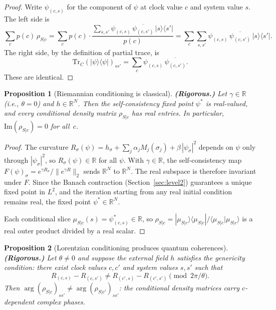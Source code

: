 \documentclass[12pt,a4paper]{article}
\newtheorem{proposition}{Proposition}
\theoremstyle{definition}
\theoremstyle{remark}
\begin{document}
\begin{proof}
Write $\psi_{(c,s)}$ for the component of $\psi$ at clock value $c$
and system value $s$. The left side is
\[
\sum_c p(c)\,\rho_{S|c} = \sum_c p(c) \cdot
\frac{\sum_{s,s'} \psi_{(c,s)}\,\overline{\psi_{(c,s')}}\,
|s\rangle\langle s'|}{p(c)}
= \sum_c \sum_{s,s'} \psi_{(c,s)}\,\overline{\psi_{(c,s')}}\,
|s\rangle\langle s'|.
\]
The right side, by the definition of partial trace, is
\[
\mathrm{Tr}_C(|\psi\rangle\langle\psi|)_{ss'}
= \sum_c \psi_{(c,s)}\,\overline{\psi_{(c,s')}}.
\]
These are identical.
\end{proof}

\begin{proposition}[Riemannian conditioning is classical]
\textbf{(Rigorous.)}
\label{prop:riem_classical}
Let $\gamma \in \mathbb{R}$ (i.e., $\theta = 0$) and $h \in
\mathbb{R}^N$. Then the self-consistency fixed point $\psi^*$ is
real-valued, and every conditional density matrix $\rho_{S|c}$ has
real entries. In particular, $\mathrm{Im}(\rho_{S|c}) = 0$ for all~$c$.
\end{proposition}

\begin{proof}
The curvature $R_\sigma(\psi) = h_\sigma + \sum_j \alpha_j M_j(\sigma_j) +
\beta\,|\psi_\sigma|^2$ depends on $\psi$ only through $|\psi_\sigma|^2$,
so $R_\sigma(\psi) \in \mathbb{R}$ for all $\psi$. With $\gamma \in
\mathbb{R}$, the self-consistency map $F(\psi)_\sigma = e^{\gamma
R_\sigma} / \|e^{\gamma R}\|_2$ sends $\mathbb{R}^N$ to $\mathbb{R}^N$.
The real subspace is therefore invariant under $F$. Since the Banach
contraction (Section~\ref{sec:level2}) guarantees a unique fixed point in
$L^2$, and the iteration starting from any real initial condition remains
real, the fixed point $\psi^* \in \mathbb{R}^N$.

Each conditional slice $\mu_{S|c}(s) = \psi^*_{(c,s)} \in \mathbb{R}$,
so $\rho_{S|c} = |\mu_{S|c}\rangle\langle\mu_{S|c}| /
\langle\mu_{S|c}|\mu_{S|c}\rangle$ is a real outer product divided by a
real scalar.
\end{proof}

\begin{proposition}[Lorentzian conditioning produces quantum coherences]
\textbf{(Rigorous.)}
\label{prop:lor_quantum}
Let $\theta \neq 0$ and suppose the external field $h$ satisfies the
genericity condition: there exist clock values $c, c'$ and system
values $s, s'$ such that
\begin{equation}
R_{(c,s)} - R_{(c,s')} \neq R_{(c',s)} - R_{(c',s')} \pmod{2\pi/\theta}.
\label{eq:genericity}
\end{equation}
Then $\arg(\rho_{S|c})_{ss'} \neq \arg(\rho_{S|c'})_{ss'}$: the
conditional density matrices carry $c$-dependent complex phases.
\end{proposition}
\end{document}
